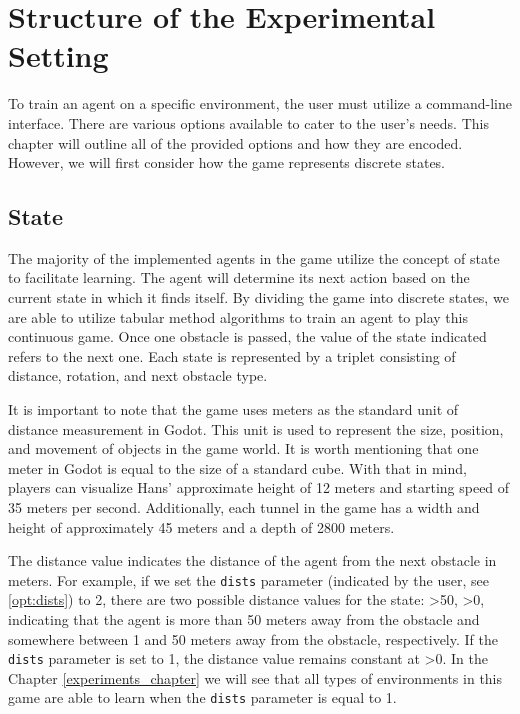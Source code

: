 \chapter{Structure of the Experimental Setting}
\label{agent_code_chapter}
To train an agent on a specific environment, the user must utilize a command-line interface. There are various options available to cater to the user's needs. This chapter will outline all of the provided options and how they are encoded. However, we will first consider how the game represents discrete states.

\section{State}
The majority of the implemented agents in the game utilize the concept of state to facilitate learning. The agent will determine its next action based on the current state in which it finds itself. By dividing the game into discrete states, we are able to utilize tabular method algorithms to train an agent to play this continuous game. Once one obstacle is passed, the value of the state indicated refers to the next one. Each state is represented by a triplet consisting of distance, rotation, and next obstacle type. 

It is important to note that the game uses meters as the standard unit of distance measurement in Godot. This unit is used to represent the size, position, and movement of objects in the game world. It is worth mentioning that one meter in Godot is equal to the size of a standard cube. With that in mind, players can visualize Hans' approximate height of 12 meters and starting speed of 35 meters per second. Additionally, each tunnel in the game has a width and height of approximately 45 meters and a depth of 2800 meters.

The distance value indicates the distance of the agent from the next obstacle in meters. For example, if we set the \texttt{dists} parameter (indicated by the user, see \ref{opt:dists}) to 2, there are two possible distance values for the state: \textgreater 50, \textgreater 0, indicating that the agent is more than 50 meters away from the obstacle and somewhere between 1 and 50 meters away from the obstacle, respectively. If the \texttt{dists} parameter is set to 1, the distance value remains constant at \textgreater 0. In the Chapter \ref{experiments_chapter} we will see that all types of environments in this game are able to learn when the \texttt{dists} parameter is equal to 1.  

